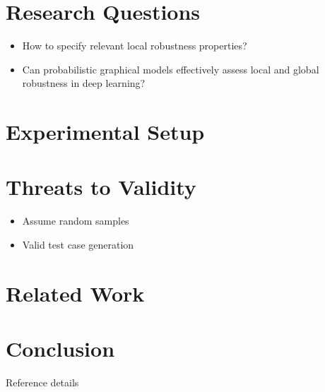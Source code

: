 \documentclass[10pt, conference, a4paper, final]{IEEEtran}
\begin{document}
\section{Research Questions}
\begin{itemize}[noitemsep]
    \item How to specify relevant local robustness properties?
    \item Can probabilistic graphical models effectively assess local and global robustness in deep learning?
\end{itemize}

\section{Experimental Setup}

\section{Threats to Validity}
\begin{itemize}[noitemsep]
    \item Assume random samples
    \item Valid test case generation
\end{itemize}

\section{Related Work}

\section{Conclusion}

\begin{thebibliography}{01}
     Reference details
\end{thebibliography}
\end{document}
